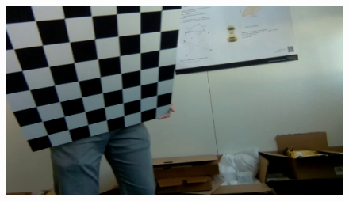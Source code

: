 \begin{figure}[H]
\begin{minipage}[t]{0.24\textwidth}
     \end{minipage}%
     \begin{minipage}[t]{0.24\textwidth}
        \centering
        \includegraphics[width=.95\textwidth]{image/3/rec_1/940_undist.png}
     \end{minipage}
     
     \hfill
     

\end{figure}

